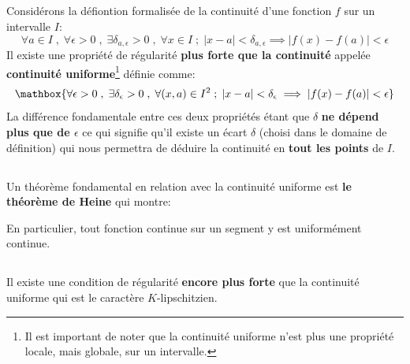 \subsection*{}
Considérons la défiontion formalisée de la continuité d'une fonction \(f\) sur un intervalle \(I\):
\[
   \forall a\in I \; , \; \forall \epsilon > 0 \; , \; \exists \delta_{a, \epsilon} > 0  \; , \; \forall x \in I \; ; \; |x - a| < \delta_{a, \epsilon} \implies |f(x) - f(a)| < \epsilon   
\]
Il existe une propriété de régularité \textbf{plus forte que la continuité} appelée \textbf{continuité uniforme}\footnote[1]{Il est important de noter que la continuité uniforme n'est plus une propriété locale, mais globale, sur un intervalle.} définie comme:
\[
   \mathbox{\forall \epsilon > 0 \; , \; \exists \delta_{\epsilon} > 0  \; , \; \forall (x, a) \in I^2 \; ; \; |x - a| < \delta_{\epsilon} \implies |f(x) - f(a)| < \epsilon }
\]
La différence fondamentale entre ces deux propriétés étant que \(\delta\) \textbf{ne dépend plus que de \(\epsilon\)} ce qui signifie qu'il existe un écart \(\delta\) (choisi dans le domaine de définition) qui nous permettra de déduire la continuité en \textbf{tout les points} de \(I\).

\subsection*{}
Un théorème fondamental en relation avec la continuité uniforme est \textbf{le théorème de Heine} qui montre:
\begin{center}
\end{center}
En particulier, tout fonction continue sur un segment y est uniformément continue.

\subsection*{}
Il existe une condition de régularité \textbf{encore plus forte} que la continuité uniforme qui est le caractère \(K\)-lipschitzien.\<

